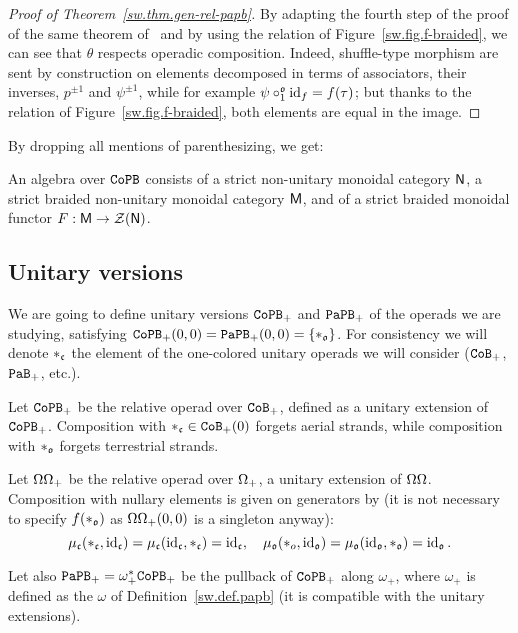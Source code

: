 \begin{proof}[Proof of Theorem~\ref{sw.thm.gen-rel-papb}]
  By adapting the fourth step of the proof of the same theorem of~\cite{Fresse2017} and by using the relation of Figure~\ref{sw.fig.f-braided}, we can see that $\theta$ respects operadic composition.
  Indeed, shuffle-type morphism are sent by construction on elements decomposed in terms of associators, their inverses, $p^{\pm 1}$ and $\psi^{\pm 1}$, while for example $\psi \circ_{1}^{\mathfrak{o}} \operatorname{id}_{f} = f(\tau)$; but thanks to the relation of Figure~\ref{sw.fig.f-braided}, both elements are equal in the image.
\end{proof}

By dropping all mentions of parenthesizing, we get:
\begin{proposition}
  An algebra over $\mathtt{CoPB}$ consists of a strict non-unitary monoidal category $\mathsf{N}$, a strict braided non-unitary monoidal category $\mathsf{M}$, and of a strict braided monoidal functor $F : \mathsf{M} \to \mathcal{Z}(\mathsf{N})$.
\end{proposition}

\subsection{Unitary versions}
\label{sw.sec.unitary-versions}

We are going to define unitary versions $\mathtt{CoPB}_{+}$ and $\mathtt{PaPB}_{+}$ of the operads we are studying, satisfying $\mathtt{CoPB}_{+}(0,0) = \mathtt{PaPB}_{+}(0,0) = \{ *_{\mathfrak{o}} \}$.
For consistency we will denote $*_{\mathfrak{c}}$ the element of the one-colored unitary operads we will consider ($\mathtt{CoB}_{+}$, $\mathtt{PaB}_{+}$, etc.).

\begin{definition}
  Let $\mathtt{CoPB}_{+}$ be the relative operad over $\mathtt{CoB}_{+}$, defined as a unitary extension of $\mathtt{CoPB}_{+}$.
  Composition with $*_{\mathfrak{c}} \in \mathtt{CoB}_{+}(0)$ forgets aerial strands, while composition with $*_{\mathfrak{o}}$ forgets terrestrial strands.
\end{definition}

\begin{definition}
  Let ${\Omega\Omega}_{+}$ be the relative operad over $\Omega_{+}$, a unitary extension of ${\Omega\Omega}$.
  Composition with nullary elements is given on generators by (it is not necessary to specify $f(*_{\mathfrak{o}})$ as ${\Omega\Omega}_{+}(0,0)$ is a singleton anyway):
  \[ \mu_{\mathfrak{c}}(*_{\mathfrak{c}}, \operatorname{id}_{\mathfrak{c}}) = \mu_{\mathfrak{c}}(\operatorname{id}_{\mathfrak{c}}, *_{\mathfrak{c}}) = \operatorname{id}_{\mathfrak{c}}, \quad \mu_{\mathfrak{o}}(*_{o}, \operatorname{id}_{\mathfrak{o}}) = \mu_{\mathfrak{o}}(\operatorname{id}_{\mathfrak{o}}, *_{\mathfrak{o}}) = \operatorname{id}_{\mathfrak{o}}. \]

  Let also $\mathtt{PaPB}_{+} = \omega_{+}^{*} \mathtt{CoPB}_{+}$ be the pullback of $\mathtt{CoPB}_{+}$ along $\omega_{+}$, where $\omega_{+}$ is defined as the $\omega$ of Definition~\ref{sw.def.papb} (it is compatible with the unitary extensions).
\end{definition}

